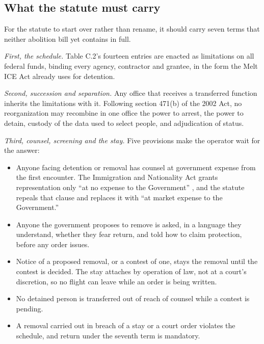 \subsection{What the statute must carry}
\label{sec:11.4.5}
For the statute to start over rather than rename, it should carry seven terms that neither abolition bill yet contains in full.

\emph{First, the schedule.} Table C.2's fourteen entries are enacted as limitations on all federal funds, binding every agency, contractor and grantee, in the form the Melt ICE Act already uses for detention.

\emph{Second, succession and separation.} Any office that receives a transferred function inherits the limitations with it. Following section 471(b) of the 2002 Act, no reorganization may recombine in one office the power to arrest, the power to detain, custody of the data used to select people, and adjudication of status.

\emph{Third, counsel, screening and the stay.} Five provisions make the operator wait for the answer:

\begin{itemize}
\item Anyone facing detention or removal has counsel at government expense from the first encounter. The Immigration and Nationality Act grants representation only “at no expense to the Government” \autocite{usc1362}, and the statute repeals that clause and replaces it with “at market expense to the Government.”
\item Anyone the government proposes to remove is asked, in a language they understand, whether they fear return, and told how to claim protection, before any order issues.
\item Notice of a proposed removal, or a contest of one, stays the removal until the contest is decided. The stay attaches by operation of law, not at a court's discretion, so no flight can leave while an order is being written.
\item No detained person is transferred out of reach of counsel while a contest is pending.
\item A removal carried out in breach of a stay or a court order violates the schedule, and return under the seventh term is mandatory.
\end{itemize}

